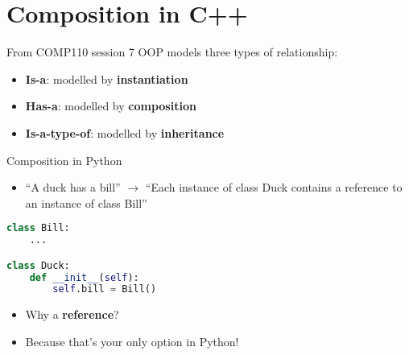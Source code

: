 \part{Composition in C++}
\frame{\partpage}

\begin{frame}{From COMP110 session 7}
    OOP models three types of relationship: \pause
    \begin{itemize}
        \item \textbf{Is-a}: modelled by \textbf{instantiation} \pause
        \item \textbf{Has-a}: modelled by \textbf{composition} \pause
        \item \textbf{Is-a-type-of}: modelled by \textbf{inheritance}
    \end{itemize}
\end{frame}

\begin{frame}[fragile]{Composition in Python}
    \begin{itemize}
        \item ``A duck has a bill'' $\to$
            ``Each instance of class Duck contains a reference to an instance of class Bill'' \pause
    \end{itemize}
    \begin{lstlisting}[language=Python]
class Bill:
    ...

class Duck:
    def __init__(self):
        self.bill = Bill()
    \end{lstlisting} \pause
    \begin{itemize}
        \item Why a \textbf{reference}? \pause
        \item Because that's your only option in Python!
    \end{itemize}
\end{frame}

